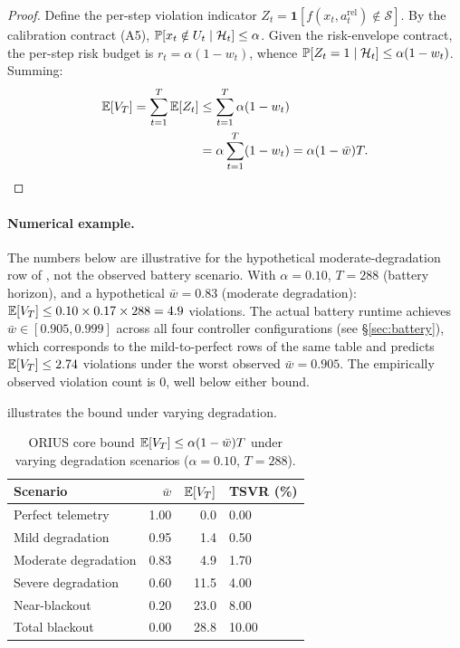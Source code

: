 \begin{proof}
Define the per-step violation indicator $Z_t = \mathbf{1}[f(x_t, a_t^{\mathrm{rel}}) \notin \mathcal{S}]$.
By the calibration contract (A5), $\operatorname{\mathbb{P}}[x_t \notin U_t \mid \mathcal{H}_t] \le \alpha$.
Given the risk-envelope contract, the per-step risk budget is
$r_t = \alpha(1 - w_t)$, whence
$\operatorname{\mathbb{P}}[Z_t = 1 \mid \mathcal{H}_t] \le \alpha(1 - w_t)$.  Summing:
\begin{align*}
  \mathbb{E}[V_T] = \sum_{t=1}^{T}\mathbb{E}[Z_t]
  &\le \sum_{t=1}^{T}\alpha(1-w_t) \\
  &= \alpha\sum_{t=1}^{T}(1-w_t)
   = \alpha(1-\bar{w})T. \qedhere
\end{align*}
\end{proof}

\paragraph{Numerical example.}
The numbers below are illustrative for the hypothetical moderate-degradation
row of , not the observed battery scenario.
With $\alpha = 0.10$, $T = 288$ (battery horizon), and a hypothetical
$\bar{w} = 0.83$ (moderate degradation):
$\mathbb{E}[V_T] \le 0.10 \times 0.17 \times 288 = 4.9$ violations.  The actual
battery runtime achieves $\bar{w} \in [0.905, 0.999]$ across all four
controller configurations (see \S\ref{sec:battery}), which corresponds to the
mild-to-perfect rows of the same table and predicts $\mathbb{E}[V_T] \le 2.74$
violations under the worst observed $\bar{w}=0.905$.  The empirically observed
violation count is 0, well below either bound.

 illustrates the bound under varying degradation.

\begin{table}[h]
\caption{ORIUS core bound $\mathbb{E}[V_T] \le \alpha(1-\bar{w})T$ under varying
degradation scenarios ($\alpha = 0.10$, $T = 288$).}
\label{tab:core_bound_scenarios}
\centering\scriptsize
\begin{tabular}{lrrl}
\toprule
\textbf{Scenario} & $\bar{w}$ & $\mathbb{E}[V_T]$ & \textbf{TSVR (\%)} \\
\midrule
Perfect telemetry      & 1.00 & 0.0  & 0.00 \\
Mild degradation       & 0.95 & 1.4  & 0.50 \\
Moderate degradation   & 0.83 & 4.9  & 1.70 \\
Severe degradation     & 0.60 & 11.5 & 4.00 \\
Near-blackout          & 0.20 & 23.0 & 8.00 \\
Total blackout         & 0.00 & 28.8 & 10.00 \\
\bottomrule
\end{tabular}
\end{table}

